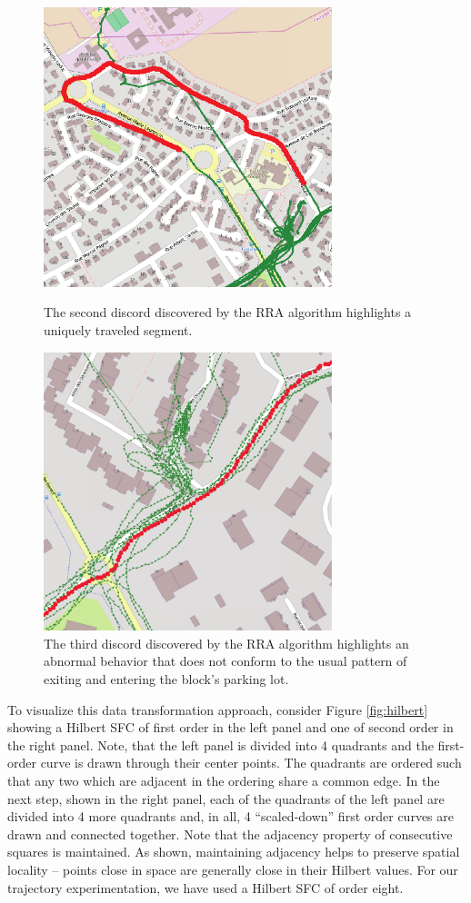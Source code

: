 \documentclass{sig-alternate}
\begin{document}
\begin{figure}[!ht]   
   \centering
   \includegraphics[width=84mm]{gps_zoom_0.pdf}
   \caption{The second discord discovered by the RRA algorithm highlights a uniquely traveled segment.}
   \label{fig:gps2}   
   \vspace{2em}
   \includegraphics[width=84mm]{gps_zoom_1.pdf}
   \caption{The third discord discovered by the RRA algorithm highlights an abnormal behavior that does not conform to the usual pattern of exiting and entering the block's parking lot.}
   \label{fig:gps_zoom}
\end{figure}

To visualize this data transformation approach, consider Figure \ref{fig:hilbert} showing a Hilbert SFC of first order in the left panel and one of second order in the right panel. Note, that the left panel is divided into 4 quadrants and the first-order curve is drawn through their center points. The quadrants are ordered such that any two which are adjacent in the ordering share a common edge. In the next step, shown in the right panel, each of the quadrants of the left panel are divided into 4 more quadrants and, in all, 4 ``scaled-down'' first order curves are drawn and connected together. Note that the adjacency property of consecutive squares is maintained. As shown, maintaining adjacency helps to preserve spatial locality -- points close in space are generally close in their Hilbert values. For our trajectory experimentation, we have used a Hilbert SFC of order eight. 
\end{document}
